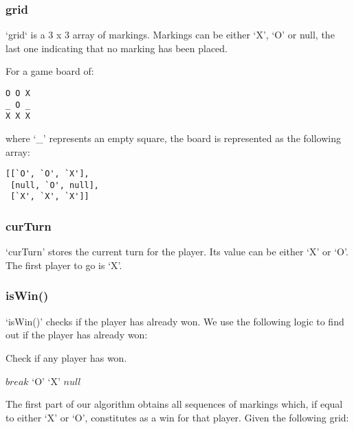 \documentclass{article}
\newcommand{\qt}[1]{\mbox{`#1'}}
\begin{document}
\subsubsection{grid}

`grid` is a 3 x 3 array of markings. Markings can be either `X', `O' or null, the last one indicating that no marking has been placed.

For a game board of:

\begin{verbatim}
O O X
_ O _
X X X
\end{verbatim}

where `_' represents an empty square, the board is represented as the following array:

\begin{verbatim}
[[`O', `O', `X'],
 [null, `O', null],
 [`X', `X', `X']]
\end{verbatim}

\subsubsection{curTurn}

`curTurn' stores the current turn for the player. Its value can be either `X' or `O'. The first player to go is `X'.

\subsubsection{isWin()}

`isWin()' checks if the player has already won. We use the following logic to find out if the player has already won:

\begin{algorithm}
\caption{Check if any player has won.}

\begin{algorithmic}[1]
      $break$
    \EndIf
  \EndFor
  \If{$seq[i + 1] = \qt{X}$}
    \Return $\qt{O}$
  \ElsIf{$seq[i + 1] = \qt{O}$}
    \Return $\qt{X}$
  \EndIf
\EndFor
\Return $null$
\EndProcedure
\end{algorithmic}
\end{algorithm}

The first part of our algorithm obtains all sequences of markings which, if equal to either `X' or `O', constitutes as a win for that player. Given the following grid:
\end{document}
